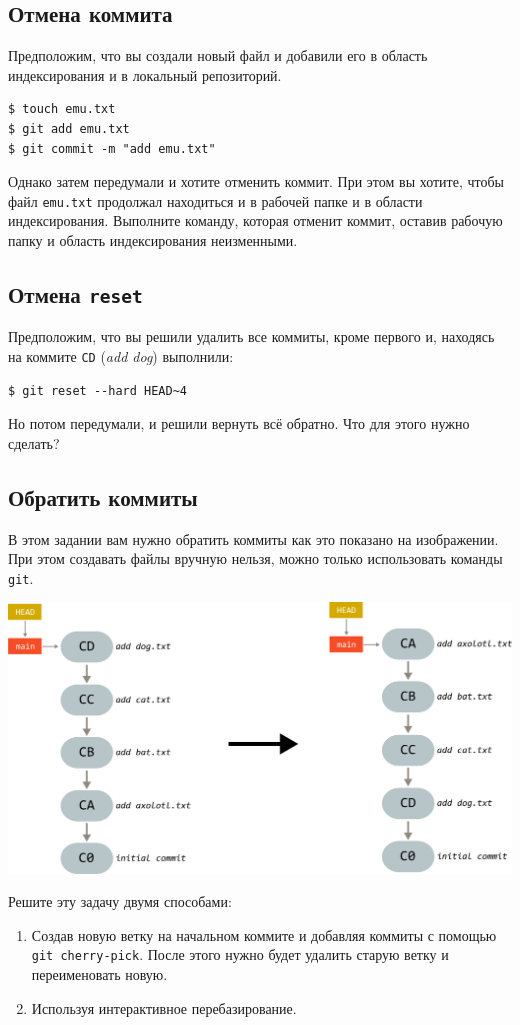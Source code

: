 \documentclass{article}
\begin{document}
\subsection{Отмена коммита}
Предположим, что вы создали новый файл и добавили его в область индексирования и в локальный репозиторий.
\begin{lstlisting}[style=csMiptBash]
$ touch emu.txt
$ git add emu.txt
$ git commit -m "add emu.txt"
\end{lstlisting}
Однако затем передумали и хотите отменить коммит. При этом вы хотите, чтобы файл \texttt{emu.txt} продолжал находиться и в рабочей папке и в области индексирования. Выполните команду, которая отменит коммит, оставив рабочую папку и область индексирования неизменными.

\subsection{Отмена \texttt{reset}}
Предположим, что вы решили удалить все коммиты, кроме первого и, находясь на коммите \texttt{CD} (\textit{add dog}) выполнили:
\begin{lstlisting}
$ git reset --hard HEAD~4
\end{lstlisting}
Но потом передумали, и решили вернуть всё обратно. Что для этого нужно сделать?


\subsection{Обратить коммиты}
В этом задании вам нужно обратить коммиты как это показано на изображении. При этом создавать файлы вручную нельзя, можно только использовать команды \texttt{git}.
\begin{center}
\includegraphics[scale=0.8]{../images/reverse_animals.png}
\end{center}
Решите эту задачу двумя способами:
\begin{enumerate}
\item Создав новую ветку на начальном коммите и добавляя коммиты с помощью \texttt{git cherry-pick}. После этого нужно будет удалить старую ветку и переименовать новую.
\item Используя интерактивное перебазирование.
\end{enumerate}
\end{document}
